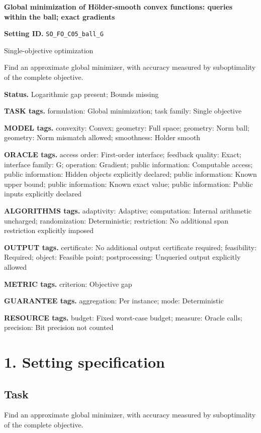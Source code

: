 \documentclass[10pt,a4paper]{article}
\begin{document}
\raggedright

{\LARGE\bfseries\sffamily\color{AtlasNavy} Global minimization of Hölder-smooth convex functions: queries within the ball; exact gradients\par}\vspace{5pt}
\textbf{Setting ID.} \texttt{SO\_\allowbreak{}FO\_\allowbreak{}C05\_\allowbreak{}ball\_\allowbreak{}G}

Single-objective optimization

Find an approximate global minimizer, with accuracy measured by suboptimality of the complete objective.

\textbf{Status.} Logarithmic gap present; Bounds missing

\textbf{TASK tags.} formulation: Global minimization; task family: Single objective

\textbf{MODEL tags.} convexity: Convex; geometry: Full space; geometry: Norm ball; geometry: Norm mismatch allowed; smoothness: Holder smooth

\textbf{ORACLE tags.} access order: First-order interface; feedback quality: Exact; interface family: G; operation: Gradient; public information: Computable access; public information: Hidden objects explicitly declared; public information: Known upper bound; public information: Known exact value; public information: Public inputs explicitly declared

\textbf{ALGORITHMS tags.} adaptivity: Adaptive; computation: Internal arithmetic uncharged; randomization: Deterministic; restriction: No additional span restriction explicitly imposed

\textbf{OUTPUT tags.} certificate: No additional output certificate required; feasibility: Required; object: Feasible point; postprocessing: Unqueried output explicitly allowed

\textbf{METRIC tags.} criterion: Objective gap

\textbf{GUARANTEE tags.} aggregation: Per instance; mode: Deterministic

\textbf{RESOURCE tags.} budget: Fixed worst-case budget; measure: Oracle calls; precision: Bit precision not counted

\section{1. Setting specification}
\subsection{Task}
Find an approximate global minimizer, with accuracy measured by suboptimality of the complete objective.
\end{document}

